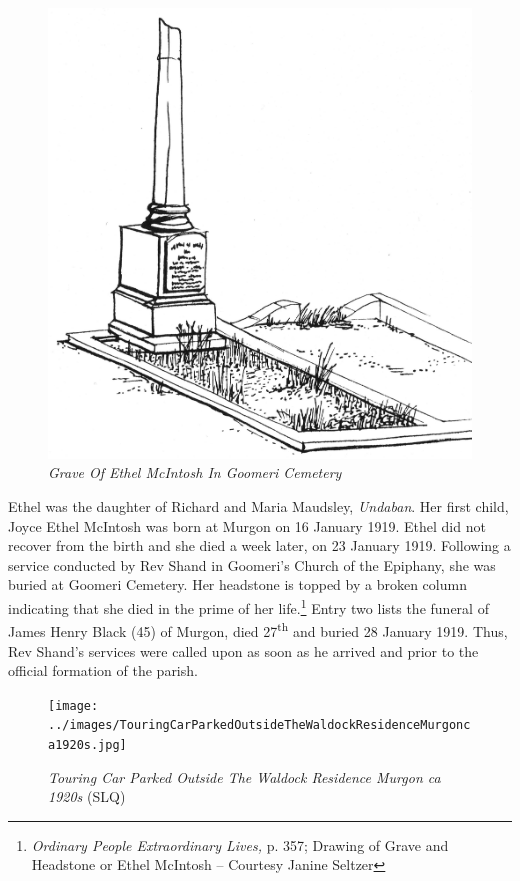 \begin{figure}
\begin{center}
\includegraphics[width=.7\linewidth,center]{../images/graveOfEthelMcIntoshInGoomeriCemetery.jpg}
\caption{\itshape Grave Of Ethel McIntosh In Goomeri Cemetery}
\end{center}
\end{figure}




Ethel was the daughter of Richard and Maria Maudsley, \emph{Undaban}. Her first child, Joyce Ethel McIntosh was born at Murgon on 16 January 1919. Ethel did not recover from the birth and she died a week later, on 23 January 1919. Following a service conducted by Rev Shand in Goomeri's Church of the Epiphany, she was buried at Goomeri Cemetery. Her headstone is topped by a broken column indicating that she died in the prime of her life.\footnote{\emph{Ordinary People Extraordinary Lives,} p. 357; Drawing of Grave and Headstone or Ethel McIntosh -- Courtesy Janine Seltzer} Entry two lists the funeral of James Henry Black (45) of Murgon, died 27\textsuperscript{th} and buried 28 January 1919. Thus, Rev Shand's services were called upon as soon as he arrived and prior to the official formation of the parish.








\begin{figure}[!htb]
\begin{center}
\texttt{[image: ../images/TouringCarParkedOutsideTheWaldockResidenceMurgonca1920s.jpg]}
\caption{{\itshape Touring Car Parked Outside The Waldock Residence Murgon ca 1920s} {\scriptsize(SLQ)}}
\end{center}
\end{figure}




